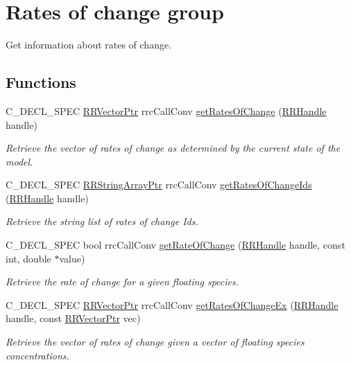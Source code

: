 \hypertarget{group__rate_of_change}{}\section{Rates of change group}
\label{group__rate_of_change}


Get information about rates of change.  


\subsection*{Functions}
\begin{DoxyCompactItemize}
\item 
C\+\_\+\+D\+E\+C\+L\+\_\+\+S\+P\+E\+C \hyperlink{rrc__types_8h_a3be72d6006034fd349f753d2bf441bf7}{R\+R\+Vector\+Ptr} rrc\+Call\+Conv \hyperlink{group__rate_of_change_gad6f6fb8bf6b5e05b6337ec3c802709b3}{get\+Rates\+Of\+Change} (\hyperlink{rrc__types_8h_a1d68f0592372208fa5a5f2799ea4b3ae}{R\+R\+Handle} handle)
\begin{DoxyCompactList}\small\item\em Retrieve the vector of rates of change as determined by the current state of the model. \end{DoxyCompactList}\item 
C\+\_\+\+D\+E\+C\+L\+\_\+\+S\+P\+E\+C \hyperlink{rrc__types_8h_a7c9475df6c7337d99482b13a365e7596}{R\+R\+String\+Array\+Ptr} rrc\+Call\+Conv \hyperlink{group__rate_of_change_gaba7873ab3d30fc5b84bc3a901dcca811}{get\+Rates\+Of\+Change\+Ids} (\hyperlink{rrc__types_8h_a1d68f0592372208fa5a5f2799ea4b3ae}{R\+R\+Handle} handle)
\begin{DoxyCompactList}\small\item\em Retrieve the string list of rates of change Ids. \end{DoxyCompactList}\item 
C\+\_\+\+D\+E\+C\+L\+\_\+\+S\+P\+E\+C bool rrc\+Call\+Conv \hyperlink{group__rate_of_change_gacf4b39414587f2d4a51c8f90d7c4a571}{get\+Rate\+Of\+Change} (\hyperlink{rrc__types_8h_a1d68f0592372208fa5a5f2799ea4b3ae}{R\+R\+Handle} handle, const int, double $\ast$value)
\begin{DoxyCompactList}\small\item\em Retrieve the rate of change for a given floating species. \end{DoxyCompactList}\item 
C\+\_\+\+D\+E\+C\+L\+\_\+\+S\+P\+E\+C \hyperlink{rrc__types_8h_a3be72d6006034fd349f753d2bf441bf7}{R\+R\+Vector\+Ptr} rrc\+Call\+Conv \hyperlink{group__rate_of_change_ga353516c3b4889b3751e3422cad518c0e}{get\+Rates\+Of\+Change\+Ex} (\hyperlink{rrc__types_8h_a1d68f0592372208fa5a5f2799ea4b3ae}{R\+R\+Handle} handle, const \hyperlink{rrc__types_8h_a3be72d6006034fd349f753d2bf441bf7}{R\+R\+Vector\+Ptr} vec)
\begin{DoxyCompactList}\small\item\em Retrieve the vector of rates of change given a vector of floating species concentrations. \end{DoxyCompactList}\end{DoxyCompactItemize}


